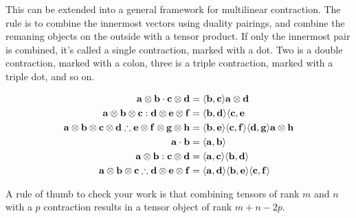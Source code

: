 This can be extended into a general framework for multilinear contraction. The rule is to combine the innermost vectors using duality pairings, and combine the remaning objects on the outside with a tensor product. If only the innermost pair is combined, it's called a single contraction, marked with a dot. Two is a double contraction, marked with a colon, three is a triple contraction, marked with a triple dot, and so on.

\begin{align}
	\vb{a} \otimes \vb{b} \cdot \vb{c} \otimes \vb{d} &= \langle \vb{b}, \vb{c} \rangle \vb{a} \otimes \vb{d} \\
	\vb{a} \otimes \vb{b} \otimes \vb{c} : \vb{d} \otimes \vb{e} \otimes \vb{f} &= \langle \vb{b}, \vb{d} \rangle \langle \vb{c}, \vb{e} \\
	\vb{a} \otimes \vb{b} \otimes \vb{c} \otimes \vb{d} \therefore \vb{e} \otimes \vb{f} \otimes \vb{g} \otimes \vb{h} &= \langle \vb{b}, \vb{e} \rangle \langle \vb{c}, \vb{f} \rangle \langle \vb{d}, \vb{g} \rangle \vb{a} \otimes \vb{h} \\
	\vb{a} \cdot \vb{b} &= \langle \vb{a}, \vb{b} \rangle \\
	\vb{a} \otimes \vb{b} : \vb{c} \otimes \vb{d} &= \langle \vb{a}, \vb{c} \rangle \langle \vb{b}, \vb{d} \rangle \\
	\vb{a} \otimes \vb{b} \otimes \vb{c} \therefore \vb{d} \otimes \vb{e} \otimes \vb{f} &= \langle \vb{a}, \vb{d} \rangle \langle \vb{b}, \vb{e} \rangle \langle \vb{c}, \vb{f} \rangle \\
\end{align}

A rule of thumb to check your work is that combining tensors of rank $m$ and $n$ with a $p$ contraction results in a tensor object of rank $m + n - 2p$.